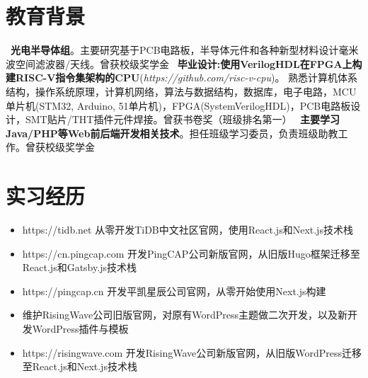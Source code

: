 \documentclass{resume}
\begin{document}
\section{ 教育背景}
        \ \textbf{光电半导体组}。主要研究基于PCB电路板，半导体元件和各种新型材料设计毫米波空间滤波器/天线。曾获校级奖学金
        \ \textbf{毕业设计:使用VerilogHDL在FPGA上构建RISC-V指令集架构的CPU}(\textit{https://github.com/risc-v-cpu})。
    熟悉计算机体系结构，操作系统原理，计算机网络，算法与数据结构，数据库，电子电路，MCU单片机(STM32, Arduino, 51单片机)，FPGA(SystemVerilogHDL)，PCB电路板设计，SMT贴片/THT插件元件焊接。曾获书卷奖（班级排名第一）
        \ \textbf{主要学习Java/PHP等Web前后端开发相关技术}。担任班级学习委员，负责班级助教工作。曾获校级奖学金

\section{ 实习经历}
        \begin{itemize}
          \item https://tidb.net 从零开发TiDB中文社区官网，使用React.js和Next.js技术栈
          \item https://cn.pingcap.com 开发PingCAP公司新版官网，从旧版Hugo框架迁移至React.js和Gatsby.js技术栈
          \item https://pingcap.cn 开发平凯星辰公司官网，从零开始使用Next.js构建
        \end{itemize}

        \begin{itemize}
          \item 维护RisingWave公司旧版官网，对原有WordPress主题做二次开发，以及新开发WordPress插件与模板
          \item https://risingwave.com 开发RisingWave公司新版官网，从旧版WordPress迁移至React.js和Next.js技术栈
        \end{itemize}
\end{document}
